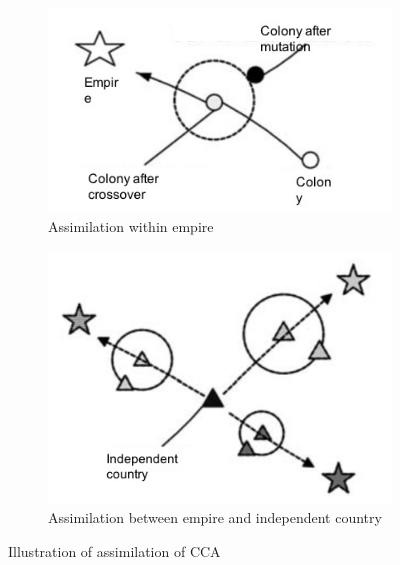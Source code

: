 \begin{figure}[h!]
	\centering
	\begin{subfigure}[b]{0.45\linewidth}
		\includegraphics[width=\linewidth]{sections/figure3a.jpg}
		\caption{Assimilation within empire}
	\end{subfigure}
	\begin{subfigure}[b]{0.45\linewidth}
		\includegraphics[width=\linewidth]{sections/figure3b.jpg}
		\caption{Assimilation between empire and independent country}
	\end{subfigure}
	\caption{Illustration of assimilation of CCA}
	\label{fig:fig3}
\end{figure}


